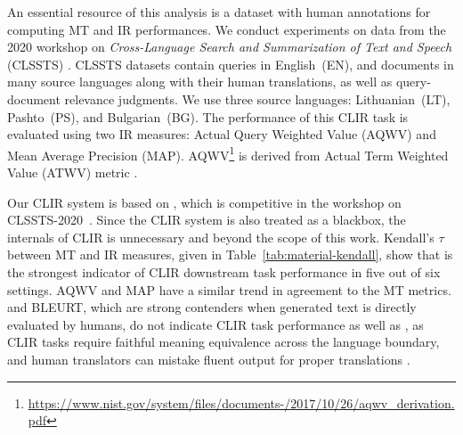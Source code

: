 An essential resource of this analysis is a dataset with human annotations for computing MT and IR performances.
We conduct experiments on data from the 2020 workshop on \textit{Cross-Language Search and Summarization of Text and Speech} (CLSSTS) \cite{zavorin-etal-2020-corpora}.
CLSSTS datasets contain queries in English~(EN), and documents in many source languages along with their human translations, as well as query-document relevance judgments. 
We use three source languages: Lithuanian~(LT), Pashto~(PS), and Bulgarian~(BG).
The performance of this CLIR task is evaluated using two IR measures: Actual Query Weighted Value (AQWV) and Mean Average Precision (MAP).
AQWV\footnote{\href{https://www.nist.gov/system/files/documents/2017/10/26/aqwv\_derivation.pdf}{https://www.nist.gov/system/files/documents-/2017/10/26/aqwv\_derivation.pdf}} is derived from Actual Term Weighted Value (ATWV) metric \cite{wegmann2013ATWV}. 


Our CLIR system is based on \citet{boschee-etal-2019-saral}, which is competitive in the workshop on CLSSTS-2020~\cite{clssts-2020}.
Since the CLIR system is also treated as a blackbox, the internals of CLIR is unnecessary and beyond the scope of this work.
Kendall's $\tau$ between MT and IR measures, given in Table~\ref{tab:material-kendall}, show that  is the strongest indicator of CLIR downstream task performance in five out of six settings.
AQWV and MAP have a similar trend in agreement to the MT metrics.
 and BLEURT, which are strong contenders when generated text is directly evaluated by humans, do not indicate CLIR task performance as well as , as CLIR tasks require faithful meaning equivalence across the language boundary, and human translators can mistake fluent output for proper translations \cite{callison-burch-etal-2007-meta}. 


